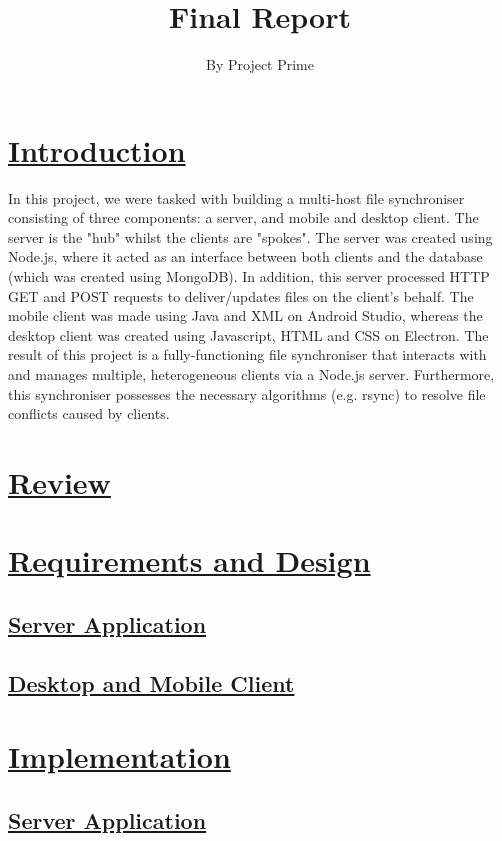 \documentclass{article}
\title{Final Report}
\author{By Project Prime}
\begin{document}
 \maketitle
 \section{\underline{Introduction}}
In this project, we were tasked with building a multi-host file synchroniser consisting of three components: a server, and mobile and desktop client. The server is the "hub" whilst the clients are "spokes". The server was created using Node.js, where it acted as an interface between both clients and the database (which was created using MongoDB). In addition, this server processed HTTP GET and POST requests to deliver/updates files on the client's behalf. The mobile client was made using Java and XML on Android Studio, whereas the desktop client was created using Javascript, HTML and CSS on Electron. The result of this project is a fully-functioning file synchroniser that interacts with and manages multiple, heterogeneous clients via a Node.js server. Furthermore, this synchroniser possesses the necessary algorithms (e.g. rsync) to resolve file conflicts caused by clients. 

\section{\underline{Review}}

\section{\underline{Requirements and Design}}

\subsection{\underline{Server Application}}

\subsection{\underline{Desktop and Mobile Client}}

\section{\underline{Implementation}}

\subsection{\underline{Server Application}}
\end{document}
